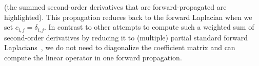 (the summed second-order derivatives that are forward-propagated are highlighted).
This propagation reduces back to the forward Laplacian  when we set $c_{i,j} = \delta_{i,j}$.
In contrast to other attempts to compute such a weighted sum of second-order derivatives by reducing it to (multiple) partial standard forward Laplacians~\cite{li2024dof}, we do not need to diagonalize the coefficient matrix and can compute the linear operator in one forward propagation.

